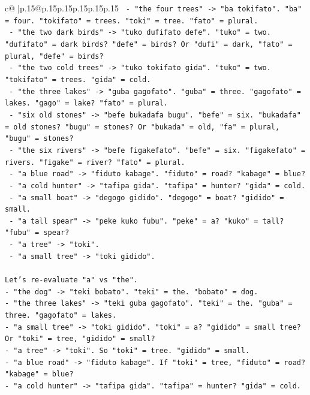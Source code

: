 \documentclass{article}
\begin{document}
{\begin{supertabular}{c@{$\;$}|p{.15\linewidth}@{}p{.15\linewidth}p{.15\linewidth}p{.15\linewidth}p{.15\linewidth}p{.15\linewidth}}
{{{\texttt{  {-} "the four trees" {-}> "ba tokifato". "ba" = four. "tokifato" = trees. "toki" = tree. "fato" = plural.} \\
\texttt{  {-} "the two dark birds" {-}> "tuko dufifato defe". "tuko" = two. "dufifato" = dark birds? "defe" = birds? Or "dufi" = dark, "fato" = plural, "defe" = birds?} \\
\texttt{  {-} "the two cold trees" {-}> "tuko tokifato gida". "tuko" = two. "tokifato" = trees. "gida" = cold.} \\
\texttt{  {-} "the three lakes" {-}> "guba gagofato". "guba" = three. "gagofato" = lakes. "gago" = lake? "fato" = plural.} \\
\texttt{  {-} "six old stones" {-}> "befe bukadafa bugu". "befe" = six. "bukadafa" = old stones? "bugu" = stones? Or "bukada" = old, "fa" = plural, "bugu" = stones?} \\
\texttt{  {-} "the six rivers" {-}> "befe figakefato". "befe" = six. "figakefato" = rivers. "figake" = river? "fato" = plural.} \\
\texttt{  {-} "a blue road" {-}> "fiduto kabage". "fiduto" = road? "kabage" = blue?} \\
\texttt{  {-} "a cold hunter" {-}> "tafipa gida". "tafipa" = hunter? "gida" = cold.} \\
\texttt{  {-} "a small boat" {-}> "degogo gidido". "degogo" = boat? "gidido" = small.} \\
\texttt{  {-} "a tall spear" {-}> "peke kuko fubu". "peke" = a? "kuko" = tall? "fubu" = spear?} \\
\texttt{  {-} "a tree" {-}> "toki".} \\
\texttt{  {-} "a small tree" {-}> "toki gidido".} \\
\\ 
\texttt{Let's re{-}evaluate "a" vs "the".} \\
\texttt{{-} "the dog" {-}> "teki bobato". "teki" = the. "bobato" = dog.} \\
\texttt{{-} "the three lakes" {-}> "teki guba gagofato". "teki" = the. "guba" = three. "gagofato" = lakes.} \\
\texttt{{-} "a small tree" {-}> "toki gidido". "toki" = a? "gidido" = small tree? Or "toki" = tree, "gidido" = small?} \\
\texttt{{-} "a tree" {-}> "toki". So "toki" = tree. "gidido" = small.} \\
\texttt{{-} "a blue road" {-}> "fiduto kabage". If "toki" = tree, "fiduto" = road? "kabage" = blue?} \\
\texttt{{-} "a cold hunter" {-}> "tafipa gida". "tafipa" = hunter? "gida" = cold.} \\
}}}
\end{supertabular}}
\end{document}
